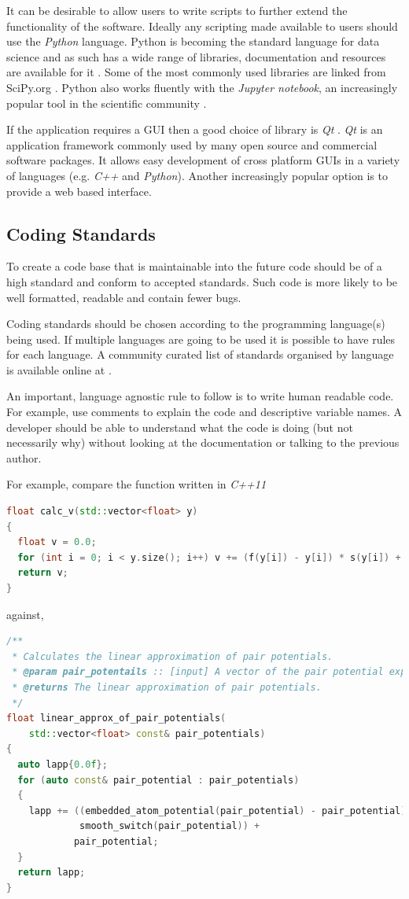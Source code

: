 \documentclass[jnr]{iosart2x}
\begin{document}
It can be desirable to allow users to write scripts to further extend the functionality of the software.
Ideally any scripting made available to users should use the {\it Python} language.
Python is becoming the standard language for data science and as such has a wide range of libraries, documentation and resources are available for it \cite{python-nature}.
Some of the most commonly used libraries are linked from SciPy.org \cite{scipy}.
Python also works fluently with the {\it Jupyter notebook}, an increasingly popular tool in the scientific community \cite{jupyter-nature}.

If the application requires a GUI then a good choice of library is {\it Qt} \cite{Qt}.
{\it Qt} is an application framework commonly used by many open source and commercial software packages.
It allows easy development of cross platform GUIs in a variety of languages (e.g. {\it C++} and {\it Python}).
Another increasingly popular option is to provide a web based interface.

\subsection{Coding Standards}
\label{Coding standards}

To create a code base that is maintainable into the future code should be of a high standard and conform to accepted standards.
Such code is more likely to be well formatted, readable and contain fewer bugs.

Coding standards should be chosen according to the programming language(s) being used.
If multiple languages are going to be used it is possible to have rules for each language.
A community curated list of standards organised by language is available online at \cite{Awesome_Guidelines}.

An important, language agnostic rule to follow is to write human readable code.
For example, use comments to explain the code and descriptive variable names.
A developer should be able to understand what the code is doing (but not necessarily why) without looking at the documentation or talking to the previous author.

For example, compare the function \cite{Lim_2015} written in {\it C++11}

\begin{lstlisting}[frame=single, language=C++]
float calc_v(std::vector<float> y)
{
  float v = 0.0;
  for (int i = 0; i < y.size(); i++) v += (f(y[i]) - y[i]) * s(y[i]) + y[i];
  return v;
}
\end{lstlisting}
against,
\begin{lstlisting}[frame=single, language=C++]
/**
 * Calculates the linear approximation of pair potentials.
 * @param pair_potentails :: [input] A vector of the pair potential experienced by each atom.
 * @returns The linear approximation of pair potentials.
 */
float linear_approx_of_pair_potentials(
    std::vector<float> const& pair_potentials)
{
  auto lapp{0.0f};
  for (auto const& pair_potential : pair_potentials)
  {
    lapp += ((embedded_atom_potential(pair_potential) - pair_potential) *
             smooth_switch(pair_potential)) +
            pair_potential;
  }
  return lapp;
}
\end{lstlisting}
\end{document}
